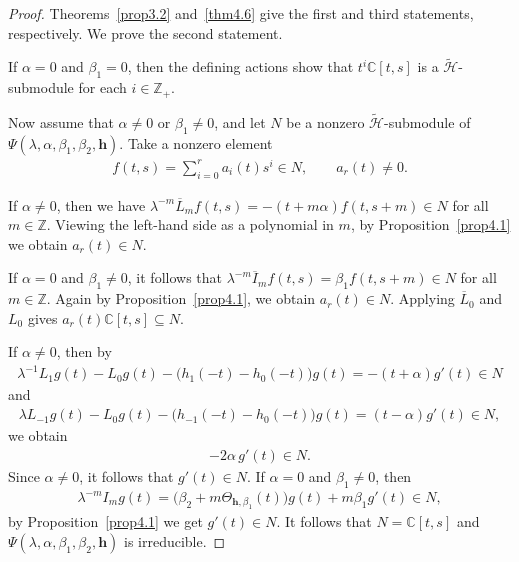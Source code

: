 \documentclass[a4paper]{amsart}
\numberwithin{equation}{section}
\begin{document}
\begin{proof}
Theorems~\ref{prop3.2} and~\ref{thm4.6} give the first and third statements, respectively. We prove the second statement.

If $\alpha=0$ and $\beta_{1}=0$, then the defining actions show that
$t^{i}\mathbb C[t,s]$ is a $\widetilde{\mathcal{H}}$-submodule for each $i\in\mathbb Z_{+}$.

Now assume that $\alpha\neq 0$ or $\beta_{1}\neq 0$, and let $N$ be a nonzero
$\widetilde{\mathcal{H}}$-submodule of $\Psi(\lambda,\alpha,\beta_{1},\beta_{2},\mathbf h)$.
Take a nonzero element
\begin{align*}
f(t,s)=\sum_{i=0}^r a_i(t)s^i\in N,
\qquad a_r(t)\neq 0.
\end{align*}

If $\alpha\neq 0$, then we have $
\lambda^{-m}\overline{L}_m f(t,s)=-(t+m\alpha)f(t,s+m)\in N
$ for all $m\in\mathbb Z$. Viewing the left-hand side as a polynomial in $m$, by
Proposition~\ref{prop4.1} we obtain $a_r(t)\in N$.

If $\alpha=0$ and $\beta_{1}\neq 0$, it follows that
$
\lambda^{-m}\overline{I}_m f(t,s)=\beta_{1}f(t,s+m)\in N
$ for all $m\in\mathbb Z$. Again by Proposition~\ref{prop4.1}, we obtain $a_r(t)\in N$. Applying $\overline{L}_0$ and $L_0$ gives $a_r(t)\mathbb{C}[t,s]\subseteq N$.

If $\alpha\neq 0$, then by
\begin{align*}
\lambda^{-1}L_1 g(t)-L_0 g(t)-\bigl(h_1(-t)-h_0(-t)\bigr)g(t)
=-(t+\alpha)g'(t)\in N
\end{align*}
and 
\begin{align*}
\lambda L_{-1} g(t)-L_0 g(t)-\bigl(h_{-1}(-t)-h_0(-t)\bigr)g(t)
=(t-\alpha)g'(t)\in N,
\end{align*}
we obtain
\begin{align*}
-2\alpha\, g'(t)\in N.
\end{align*}
Since $\alpha\neq 0$, it follows that $g'(t)\in N$. If $\alpha=0$ and $\beta_{1}\neq 0$, then
\begin{align*}
\lambda^{-m}I_m g(t)=\bigl(\beta_{2}+m\Theta_{\mathbf h,\beta_1}(t)\bigr)g(t)+m\beta_{1}g'(t)\in N,
\end{align*}
by Proposition~\ref{prop4.1} we get $g'(t)\in N$. It follows that $N=\mathbb C[t,s]$ and
$\Psi(\lambda,\alpha,\beta_{1},\beta_{2},\mathbf h)$ is irreducible.
\end{proof}
\end{document}

